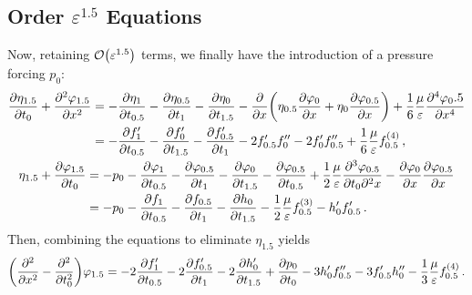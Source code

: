 \documentclass{jfm}
\let\Oldsubsection\subsection
\renewcommand{\subsection}{\FloatBarrier\Oldsubsection}
\renewcommand*{\epsilon}{\varepsilon}
\begin{document}
\subsection{Order \texorpdfstring{$\epsilon^{1.5}$}{1.5} Equations}
Now, retaining $\order{\epsilon^{1.5}}$ terms, we finally have the
introduction of a pressure forcing $p_0$:
\begin{gather}
  \begin{aligned}
    \pdv{\eta_{1.5}}{t_0} + \pdv[2]{\varphi_{1.5}}{x} &=
      -\pdv{\eta_{1}}{t_{0.5}}
      -\pdv{\eta_{0.5}}{t_{1}}
      -\pdv{\eta_{0}}{t_{1.5}}
      - \pdv{x} \pqty{\eta_{0.5} \pdv{\varphi_0}{x} + \eta_0
      \pdv{\varphi_{0.5}}{x}} + \frac{1}{6} \frac{\mu}{\epsilon}
      \pdv[4]{\varphi_0.5}{x} \\
    &= -\pdv{f_1'}{t_{0.5}} -\pdv{f_0'}{t_{1.5}} -\pdv{f_{0.5}'}{t_1}
      -2 f_{0.5}' f_0'' -2 f_0' f_{0.5}'' + \frac{1}{6}
      \frac{\mu}{\epsilon} f_{0.5}^{(4)}
      \,,
  \end{aligned}
  \\
  \begin{aligned}
    \eta_{1.5} + \pdv{\varphi_{1.5}}{t_0} &=
      -p_0
      -\pdv{\varphi_1}{t_{0.5}}
      -\pdv{\varphi_{0.5}}{t_1}
      -\pdv{\varphi_0}{t_{1.5}}
      - \pdv{\varphi_{0.5}}{t_{0.5}}
      + \frac{1}{2} \frac{\mu}{\epsilon} \frac{\partial^3 \varphi_{0.5}}
        {\partial t_0 \partial^2 x}
      - \pdv{\varphi_0}{x} \pdv{\varphi_{0.5}}{x} \\
    &= -p_0
      -\pdv{f_1}{t_{0.5}}
      -\pdv{f_{0.5}}{t_1}
      -\pdv{h_0}{t_{1.5}}
      - \frac{1}{2} \frac{\mu}{\epsilon} f_{0.5}^{(3)} - h_0' f_{0.5}'
      \,.
  \end{aligned}
\end{gather}
Then, combining the equations to eliminate $\eta_{1.5}$ yields
\begin{equation}
  \pqty{\pdv[2]{x} - \pdv[2]{t_0}} \varphi_{1.5} =
    -2 \pdv{f_1'}{t_{0.5}}
    -2 \pdv{f_{0.5}'}{t_1}
    -2 \pdv{h_0'}{t_{1.5}}
    + \pdv{p_0}{t_0}
    - 3 h_0' f_{0.5}''
    - 3 f_{0.5}' h_0''
    - \frac{1}{3} \frac{\mu}{\epsilon} f_{0.5}^{(4)}
    \,.
\end{equation}
\end{document}
